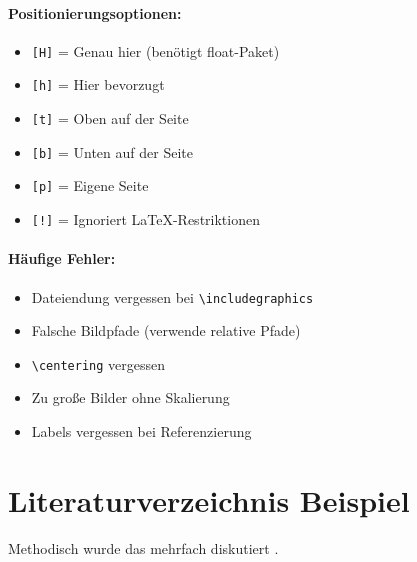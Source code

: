 \documentclass[twoside]{scrreprt}
\begin{document}
\paragraph{Positionierungsoptionen:}
\begin{itemize}
  \item \texttt{[H]} = Genau hier (benötigt float-Paket)
  \item \texttt{[h]} = Hier bevorzugt
  \item \texttt{[t]} = Oben auf der Seite
  \item \texttt{[b]} = Unten auf der Seite
  \item \texttt{[p]} = Eigene Seite
  \item \texttt{[!]} = Ignoriert LaTeX-Restriktionen
\end{itemize}

\paragraph{Häufige Fehler:}
\begin{itemize}
  \item Dateiendung vergessen bei \texttt{\textbackslash includegraphics}
  \item Falsche Bildpfade (verwende relative Pfade)
  \item \texttt{\textbackslash centering} vergessen
  \item Zu große Bilder ohne Skalierung
  \item Labels vergessen bei Referenzierung
\end{itemize}




\cleardoublepage
\section{Literaturverzeichnis Beispiel}
  \noindent
  Methodisch wurde das mehrfach diskutiert \parencite{einstein1905,knuth1984,lamport1994}.

  \printbibliography %
\end{document}
